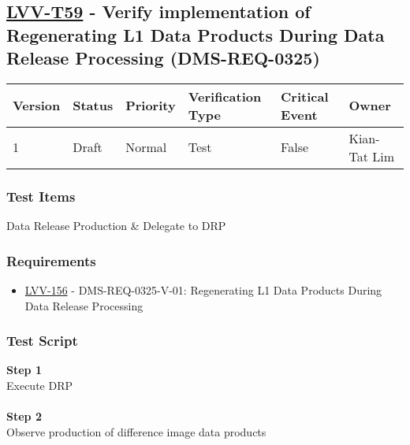 \hypertarget{lvv-t59---verify-implementation-of-regenerating-l1-data-products-during-data-release-processing-dms-req-0325}{%
\subsection{\texorpdfstring{\href{https://jira.lsstcorp.org/secure/Tests.jspa\#/testCase/LVV-T59}{LVV-T59}
- Verify implementation of Regenerating L1 Data Products During Data
Release Processing
(DMS-REQ-0325)}{LVV-T59 - Verify implementation of Regenerating L1 Data Products During Data Release Processing (DMS-REQ-0325)}}\label{lvv-t59---verify-implementation-of-regenerating-l1-data-products-during-data-release-processing-dms-req-0325}}

\begin{longtable}[]{@{}llllll@{}}
\toprule
Version & Status & Priority & Verification Type & Critical Event &
Owner\tabularnewline
\midrule
\endhead
1 & Draft & Normal & Test & False & Kian-Tat Lim\tabularnewline
\bottomrule
\end{longtable}

\hypertarget{test-items-148}{%
\subsubsection{Test Items}\label{test-items-148}}

Data Release Production \& Delegate to DRP

\hypertarget{requirements-149}{%
\subsubsection{Requirements}\label{requirements-149}}

\begin{itemize}
\tightlist
\item
  \href{https://jira.lsstcorp.org/browse/LVV-156}{LVV-156} -
  DMS-REQ-0325-V-01: Regenerating L1 Data Products During Data Release
  Processing
\end{itemize}

\hypertarget{test-script-149}{%
\subsubsection{Test Script}\label{test-script-149}}

\textbf{Step 1}\\
Execute DRP\\
~\\
\textbf{Step 2}\\
Observe production of difference image data products\\
~\\

